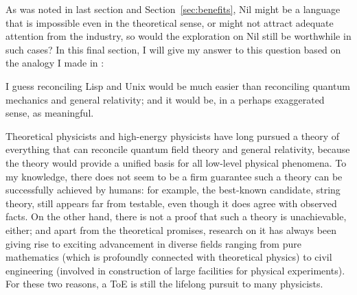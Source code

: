 As was noted in last section and Section~\ref{sec:benefits}, Nil might be a
language that is impossible even in the theoretical sense, or might not attract
adequate attention from the industry, so would the exploration on Nil still be
worthwhile in such cases?  In this final section, I will give my answer
to this question based on the analogy I made in \parencite{vector2018c}:
\begin{quoting}
	I guess reconciling Lisp and Unix would be much easier than
	reconciling quantum mechanics and general relativity; and
	it would be, in a perhaps exaggerated sense, as meaningful.
\end{quoting}

Theoretical physicists and high-energy physicists have long pursued a theory
of everything that can reconcile quantum field theory and general relativity,
because the theory would provide a unified basis for all low-level physical
phenomena.  To my knowledge, there does not seem to be a firm guarantee such
a theory can be successfully achieved by humans: for example, the best-known
candidate, string theory, still appears far from testable, even though it does
agree with observed facts.  On the other hand, there is not a proof that such
a theory is unachievable, either; and apart from the theoretical promises,
research on it has always been giving rise to exciting advancement in diverse
fields ranging from pure mathematics (which is profoundly connected with
theoretical physics) to civil engineering (involved in construction of
large facilities for physical experiments).  For these two reasons,
a ToE is still the lifelong pursuit to many physicists.

